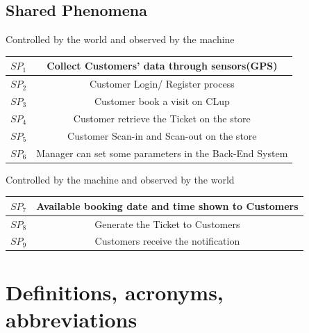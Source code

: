 \documentclass[a4paper,12pt]{report}
\begin{document}
\subsection{Shared Phenomena}
Controlled by the world and observed by the machine\\
\begin{center}
	\begin{tabular}{ c|c } 
		\hline
		$SP_1$ & Collect Customers' data through sensors(GPS) \\ 
		\hline
		$SP_2$ & Customer Login/ Register process \\ 
		\hline
		$SP_3$ & Customer book a visit on CLup \\ 
		\hline
		$SP_4$ & Customer retrieve the Ticket on the store\\ 
		\hline
		$SP_5$ & Customer Scan-in and Scan-out on the store\\ 
		\hline
		$SP_6$ & Manager can set some parameters in the Back-End System \\ 
		\hline
	\end{tabular}
\end{center}


Controlled by the machine and observed by the world \\
\begin{center}
	\begin{tabular}{ c|c } 
		\hline
		$SP_7$ &  Available booking date and time shown to Customers \\ 
		\hline
		$SP_8$ &  Generate the Ticket to Customers \\ 
		\hline
		$SP_9$ &  Customers receive the notification \\ 
		\hline
	\end{tabular}
\end{center}



\section{Definitions, acronyms, abbreviations}
\end{document}
